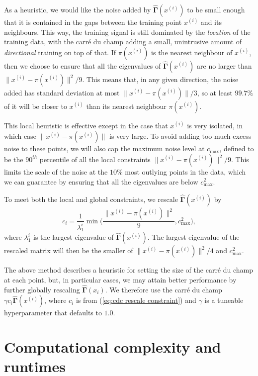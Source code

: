 \documentclass{article} %
\newcommand{\G}{\widehat{\mathbf{\Gamma}}}
\begin{document}
As a heuristic, we would like the noise added by $\G(x^{(i)})$ to be small enough that it is contained in the gaps between the training point $x^{(i)}$ and its neighbours.
This way, the training signal is still dominated by the \textit{location} of the training data, with the carré du champ adding a small, unintrusive amount of \textit{directional} training on top of that.
If $\pi(x^{(i)})$ is the nearest neighbour of $x^{(i)}$, then we choose to ensure that all the eigenvalues of $\G(x^{(i)})$ are no larger than $\| x^{(i)} - \pi(x^{(i)}) \| ^2 / 9$.
This means that, in any given direction, the noise added has standard deviation at most $\| x^{(i)} - \pi(x^{(i)}) \| / 3$, so at least $99.7\%$ of it will be closer to $x^{(i)}$ than its nearest neighbour $\pi(x^{(i)})$.

This local heuristic is effective except in the case that $x^{(i)}$ is very isolated, in which case $\| x^{(i)} - \pi(x^{(i)}) \|$ is very large.
To avoid adding too much excess noise to these points, we will also cap the maximum noise level at $c_{\max}$, defined to be the $90^{th}$ percentile of all the local constraints $\| x^{(i)} - \pi(x^{(i)}) \| ^2 / 9$.
This limits the scale of the noise at the $10\%$ most outlying points in the data, which we can guarantee by ensuring that all the eigenvalues are below $c_{\max}^2$.

To meet both the local and global constraints, we rescale $\G(x^{(i)})$ by
\begin{equation}
\label{eq:cdc rescale constraint}
c_i = \frac{1}{\lambda_1^i}\min \Big( \frac{\| x^{(i)} - \pi(x^{(i)}) \| ^2}{9}, c_{\max}^2 \Big),
\end{equation}
where $\lambda_1^i$ is the largest eigenvalue of $\G(x^{(i)})$.
The largest eigenvalue of the rescaled matrix will then be the smaller of $\| x^{(i)} - \pi(x^{(i)}) \| ^2 / 4$ and $c_{\max}^2$.

The above method describes a heuristic for setting the size of the carré du champ at each point, but, in particular cases, we may attain better performance by further globally rescaling $\G(x_i)$.
We therefore use the carré du champ $\gamma c_i \G(x^{(i)})$, where $c_i$ is from (\ref{eq:cdc rescale constraint}) and $\gamma$ is a tuneable hyperparameter that 
defaults to $1.0$.

\section{Computational complexity and runtimes}\label{section:complexity}
\end{document}
